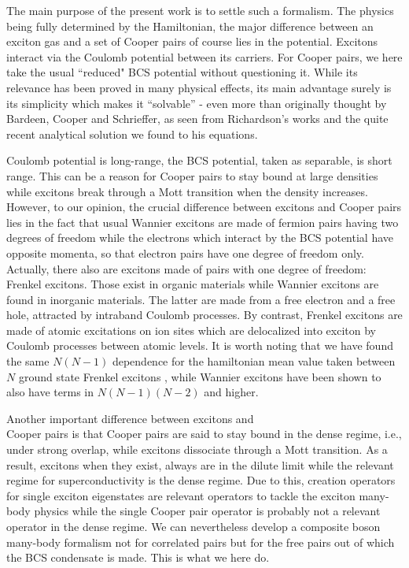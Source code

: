 \documentclass[epj]{svjour}
\begin{document}
The main purpose of the present work is to settle such a formalism. The physics being fully determined by the Hamiltonian, the major difference between an exciton gas and a set of Cooper pairs of course lies in the potential. Excitons interact via the Coulomb potential between its carriers. For Cooper pairs, we here take the usual ``reduced" BCS potential without questioning it. While its relevance has been proved in many physical effects, its main advantage surely is its simplicity which makes it ``solvable'' - even more than originally thought by Bardeen, Cooper and Schrieffer, as seen from Richardson's works and the quite recent analytical solution we found to his equations\cite{Richardson1,Ushveridze,ortiz}.
 
  Coulomb potential is long-range, the BCS potential, taken as separable, is short range. This can be a reason for Cooper pairs to stay bound at large densities while excitons break through a Mott transition when the density increases. However, to our opinion, the crucial difference between excitons and Cooper pairs lies in the fact that usual Wannier excitons  are made of fermion pairs having two degrees of freedom while the electrons which interact by the BCS potential have opposite momenta, so that electron pairs have one degree of freedom only.  Actually, there also are excitons made of pairs with one degree of freedom: Frenkel excitons. Those exist in organic materials while Wannier excitons are found in inorganic materials. The latter are made from a free electron and a free hole, attracted by intraband Coulomb processes. By contrast, Frenkel excitons are made of atomic excitations on ion sites which are delocalized into exciton by Coulomb processes between atomic levels.  It is worth noting that we have found the same  $N(N-1)$ dependence for the hamiltonian mean value taken between $N$ ground state Frenkel excitons \cite{frenkel}, while Wannier excitons have been shown to also have terms in $N(N-1)(N-2)$ and higher\cite{monicOdil}.




 Another important difference between excitons and \\Cooper pairs is that Cooper pairs are said to stay bound in the dense regime, i.e., under strong overlap, while excitons dissociate through a Mott transition. As a result, excitons when they exist, always are in the dilute limit while the relevant regime for superconductivity is the dense regime. Due to this, creation operators for single exciton eigenstates are relevant operators to tackle the exciton many-body physics while the single Cooper pair operator is probably not a relevant operator in the dense regime. We can nevertheless develop a composite boson many-body formalism not for correlated pairs but for the free pairs out of which the BCS condensate is made. This is what we here do.
\end{document}
